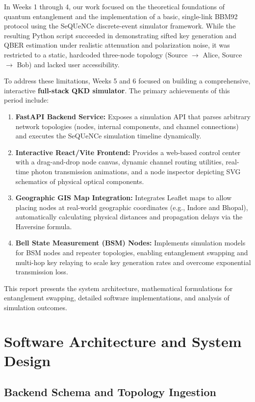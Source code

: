 \documentclass[12pt,oneside,letterpaper,english]{article}
\begin{document}
In Weeks 1 through 4, our work focused on the theoretical foundations of quantum entanglement and the implementation of a basic, single-link BBM92 protocol using the SeQUeNCe discrete-event simulator framework. While the resulting Python script succeeded in demonstrating sifted key generation and QBER estimation under realistic attenuation and polarization noise, it was restricted to a static, hardcoded three-node topology (Source $\rightarrow$ Alice, Source $\rightarrow$ Bob) and lacked user accessibility.

To address these limitations, Weeks 5 and 6 focused on building a comprehensive, interactive \textbf{full-stack QKD simulator}. The primary achievements of this period include:
\begin{enumerate}
    \item \textbf{FastAPI Backend Service:} Exposes a simulation API that parses arbitrary network topologies (nodes, internal components, and channel connections) and executes the SeQUeNCe simulation timeline dynamically.
    \item \textbf{Interactive React/Vite Frontend:} Provides a web-based control center with a drag-and-drop node canvas, dynamic channel routing utilities, real-time photon transmission animations, and a node inspector depicting SVG schematics of physical optical components.
    \item \textbf{Geographic GIS Map Integration:} Integrates Leaflet maps to allow placing nodes at real-world geographic coordinates (e.g., Indore and Bhopal), automatically calculating physical distances and propagation delays via the Haversine formula.
    \item \textbf{Bell State Measurement (BSM) Nodes:} Implements simulation models for BSM nodes and repeater topologies, enabling entanglement swapping and multi-hop key relaying to scale key generation rates and overcome exponential transmission loss.
\end{enumerate}

This report presents the system architecture, mathematical formulations for entanglement swapping, detailed software implementations, and analysis of simulation outcomes.

\section{Software Architecture and System Design}

\subsection{Backend Schema and Topology Ingestion}
\end{document}
